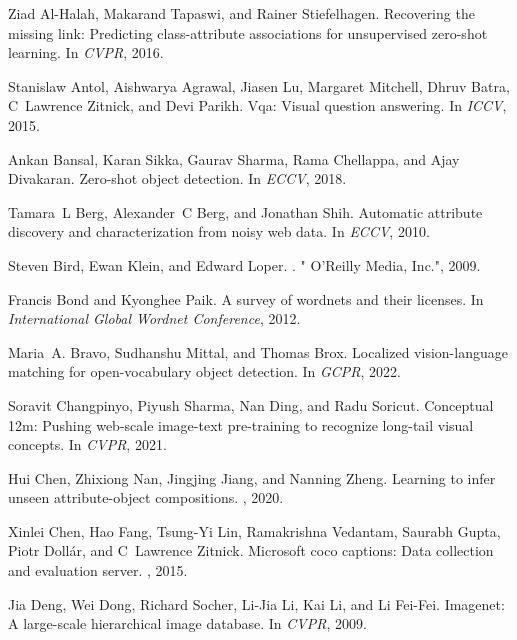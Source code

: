 \documentclass[10pt,twocolumn,letterpaper]{article}
\begin{document}
\begin{thebibliography}{10}\itemsep=-1pt

Ziad Al-Halah, Makarand Tapaswi, and Rainer Stiefelhagen.
\newblock Recovering the missing link: Predicting class-attribute associations
  for unsupervised zero-shot learning.
\newblock In {\em CVPR}, 2016.

Stanislaw Antol, Aishwarya Agrawal, Jiasen Lu, Margaret Mitchell, Dhruv Batra,
  C~Lawrence Zitnick, and Devi Parikh.
\newblock Vqa: Visual question answering.
\newblock In {\em ICCV}, 2015.

Ankan Bansal, Karan Sikka, Gaurav Sharma, Rama Chellappa, and Ajay Divakaran.
\newblock Zero-shot object detection.
\newblock In {\em ECCV}, 2018.

Tamara~L Berg, Alexander~C Berg, and Jonathan Shih.
\newblock Automatic attribute discovery and characterization from noisy web
  data.
\newblock In {\em ECCV}, 2010.

Steven Bird, Ewan Klein, and Edward Loper.
.
\newblock " O'Reilly Media, Inc.", 2009.

Francis Bond and Kyonghee Paik.
\newblock A survey of wordnets and their licenses.
\newblock In {\em International Global Wordnet Conference}, 2012.

Maria~A. Bravo, Sudhanshu Mittal, and Thomas Brox.
\newblock Localized vision-language matching for open-vocabulary object
  detection.
\newblock In {\em GCPR}, 2022.

Soravit Changpinyo, Piyush Sharma, Nan Ding, and Radu Soricut.
\newblock Conceptual 12m: Pushing web-scale image-text pre-training to
  recognize long-tail visual concepts.
\newblock In {\em CVPR}, 2021.

Hui Chen, Zhixiong Nan, Jingjing Jiang, and Nanning Zheng.
\newblock Learning to infer unseen attribute-object compositions.
, 2020.

Xinlei Chen, Hao Fang, Tsung-Yi Lin, Ramakrishna Vedantam, Saurabh Gupta, Piotr
  Doll{\'a}r, and C~Lawrence Zitnick.
\newblock Microsoft coco captions: Data collection and evaluation server.
, 2015.

Jia Deng, Wei Dong, Richard Socher, Li-Jia Li, Kai Li, and Li Fei-Fei.
\newblock Imagenet: A large-scale hierarchical image database.
\newblock In {\em CVPR}, 2009.


\end{thebibliography}
\end{document}
